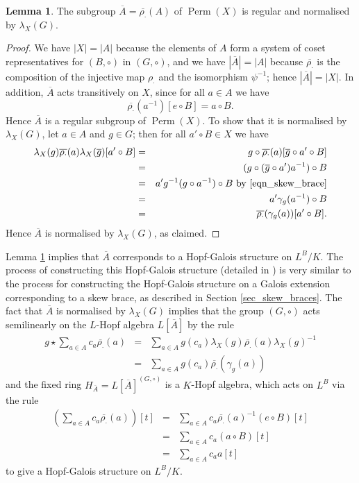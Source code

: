 \documentclass[12pt,a4paper, reqno]{amsart}
\theoremstyle{definition}
\newtheorem{lemma}[theorem]{Lemma}
\renewcommand{\bar}{\overline}
\DeclareMathOperator{\Perm}{\mbox{Perm}}
\begin{document}
\begin{lemma} \label{lem_A_bar_regular}
The subgroup $ \overline{A} = \overline{\rho_{\cdot}}(A) $ of $ \Perm(X) $ is regular and normalised by $ \lambda_{X}(G) $.
\end{lemma}
\begin{proof}
We have $ |X|=|A| $ because the elements of $ A $ form a system of coset representatives for $ (B,\circ) $ in $ (G,\circ) $, and we have $ |\overline{A}| = |A| $ because $ \overline{\rho_{\cdot}} $ is the composition of the injective map $ \rho_{\cdot} $ and the isomorphism $ \psi^{-1} $; hence $ |\overline{A}| = |X| $. In addition, $ \overline{A} $ acts transitively on $ X $, since for all $ a \in A $ we have
\[ \overline{\rho_{\cdot}}(a^{-1})[e \circ B] = a \circ B. \]
Hence $ \overline{A} $ is a regular subgroup of $ \Perm(X) $. To show that it is normalised by $ \lambda_{X}(G) $, let $ a \in A $ and $ g \in G $; then for all $ a' \circ B \in X $ we have
\begin{eqnarray*}
\lambda_{X}(g) \overline{\rho_{\cdot}}(a) \lambda_{X}(\bar{g}) [a' \circ B] 
& = & g \circ \overline{\rho_{\cdot}}(a) [\bar{g} \circ a' \circ B] \\
& = & (g \circ (\bar{g} \circ a')a^{-1}) \circ B \\
& = & a'g^{-1}(g \circ a^{-1}) \circ B \mbox{ by \eqref{eqn_skew_brace}} \\
& = & a' \gamma_{g}(a^{-1}) \circ B \\
& = & \overline{\rho_{\cdot}}(\gamma_{g}(a)) [a' \circ B].
\end{eqnarray*}
Hence $ \overline{A} $ is normalised by $ \lambda_{X}(G) $, as claimed.
\end{proof}

Lemma \ref{lem_A_bar_regular} implies that $ \overline{A} $ corresponds to a Hopf-Galois structure on $ L^{B}/K $. The process of constructing this Hopf-Galois structure (detailed in \cite{GP87}) is very similar to the process for constructing the Hopf-Galois structure on a Galois extension corresponding to a skew brace, as described in Section \ref{sec_skew_braces}. The fact that $ \overline{A} $ is normalised by $ \lambda_{X}(G) $ implies that the group $ (G,\circ) $ acts semilinearly on the $ L $-Hopf algebra $ L[\overline{A}] $ by the rule
\begin{eqnarray*} 
g \star \sum_{a \in A} c_{a} \overline{\rho_{\cdot}}(a)
& = & \sum_{a \in A} g(c_{a}) \lambda_{X}(g) \overline{\rho_{\cdot}}(a) \lambda_{X}(g)^{-1} \\
& = & \sum_{a \in A} g(c_{a}) \overline{\rho_{\cdot}}(\gamma_{g}(a)) 
\end{eqnarray*}
and the fixed ring $ H_{\overline{A}} = L[\overline{A}]^{(G,\circ)} $ is a $ K $-Hopf algebra, which acts on $ L^{B} $ via the rule
\begin{eqnarray} 
\left( \sum_{a \in A} c_{a} \overline{\rho_{\cdot}}(a) \right) [t] 
& = & \sum_{a \in A} c_{a} \overline{\rho_{\cdot}}(a)^{-1}(e \circ B)[t] \nonumber \\
& = & \sum_{a \in A} c_{a} (a \circ B)[t] \nonumber \\
& = & \sum_{a \in A} c_{a} a[t] \label{eqn_GP_action_on_L}
\end{eqnarray}
to give a Hopf-Galois structure on $ L^{B}/K $.
\end{document}
